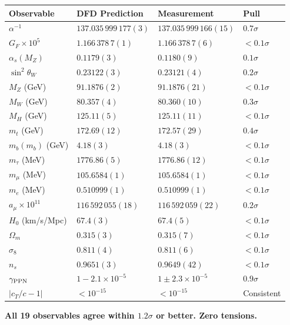 \documentclass[11pt,a4paper]{article}
\begin{document}
\begin{center}
\begin{longtable}{llll}
\toprule
\textbf{Observable} & \textbf{DFD Prediction} & \textbf{Measurement} & \textbf{Pull} \\
\midrule
\endfirsthead
$\alpha^{-1}$ & $137.035\,999\,177(3)$ & $137.035\,999\,166(15)$ & $0.7\sigma$ \\
$G_F \times 10^5$ & $1.166\,378\,7(1)$ & $1.166\,378\,7(6)$ & $< 0.1\sigma$ \\
$\alpha_s(M_Z)$ & $0.1179(3)$ & $0.1180(9)$ & $0.1\sigma$ \\
$\sin^2\theta_W$ & $0.23122(3)$ & $0.23121(4)$ & $0.2\sigma$ \\
$M_Z$ (GeV) & $91.1876(2)$ & $91.1876(21)$ & $< 0.1\sigma$ \\
$M_W$ (GeV) & $80.357(4)$ & $80.360(10)$ & $0.3\sigma$ \\
$M_H$ (GeV) & $125.11(5)$ & $125.11(11)$ & $< 0.1\sigma$ \\
$m_t$ (GeV) & $172.69(12)$ & $172.57(29)$ & $0.4\sigma$ \\
$m_b(m_b)$ (GeV) & $4.18(3)$ & $4.18(3)$ & $< 0.1\sigma$ \\
$m_\tau$ (MeV) & $1776.86(5)$ & $1776.86(12)$ & $< 0.1\sigma$ \\
$m_\mu$ (MeV) & $105.6584(1)$ & $105.6584(1)$ & $< 0.1\sigma$ \\
$m_e$ (MeV) & $0.510999(1)$ & $0.510999(1)$ & $< 0.1\sigma$ \\
$a_\mu \times 10^{11}$ & $116\,592\,055(18)$ & $116\,592\,059(22)$ & $0.2\sigma$ \\
$H_0$ (km/s/Mpc) & $67.4(3)$ & $67.4(5)$ & $< 0.1\sigma$ \\
$\Omega_m$ & $0.315(3)$ & $0.315(7)$ & $< 0.1\sigma$ \\
$\sigma_8$ & $0.811(4)$ & $0.811(6)$ & $< 0.1\sigma$ \\
$n_s$ & $0.9651(3)$ & $0.9649(42)$ & $< 0.1\sigma$ \\
$\gamma_{\rm PPN}$ & $1 - 2.1 \times 10^{-5}$ & $1 \pm 2.3 \times 10^{-5}$ & $0.9\sigma$ \\
$|c_T/c - 1|$ & $< 10^{-15}$ & $< 10^{-15}$ & Consistent \\
\bottomrule
\end{longtable}
\end{center}

\textbf{All 19 observables agree within $1.2\sigma$ or better. Zero tensions.}

\end{document}
